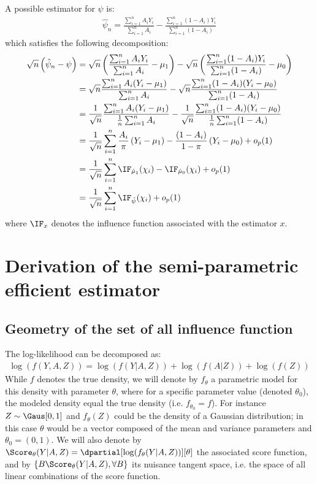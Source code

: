 \documentclass[12pt]{article}
\newcommand\sample{\chi}
\begin{document}
A possible estimator for \(\psi\) is:
\begin{align*}
\hat{\psi}_n = \frac{\sum_{i=1}^n A_i Y_i}{\sum_{i=1}^n A_i} - \frac{\sum_{i=1}^n (1-A_i) Y_i}{\sum_{i=1}^n (1-A_i)}
\end{align*}
which satisfies the following decomposition:
\begin{align*}
\sqrt{n}\left(\hat{\psi}_n - \psi\right) 
&= \sqrt{n} \left(\frac{\sum_{i=1}^n A_i Y_i}{\sum_{i=1}^n A_i} - \mu_1\right) - \sqrt{n} \left(\frac{\sum_{i=1}^n (1-A_i) Y_i}{\sum_{i=1}^n (1-A_i)} - \mu_0\right) \\
&= \sqrt{n} \frac{\sum_{i=1}^n A_i (Y_i-\mu_1)}{\sum_{i=1}^n A_i}  - \sqrt{n} \frac{\sum_{i=1}^n (1-A_i) (Y_i-\mu_0)}{\sum_{i=1}^n (1-A_i)} \\
&= \frac{1}{\sqrt{n}} \frac{\sum_{i=1}^n A_i (Y_i-\mu_1)}{\frac{1}{n}\sum_{i=1}^n A_i}  - \frac{1}{\sqrt{n}} \frac{\sum_{i=1}^n (1-A_i) (Y_i-\mu_0)}{\frac{1}{n}\sum_{i=1}^n (1-A_i)} \\
&= \frac{1}{\sqrt{n}} \sum_{i=1}^n \frac{A_i}{\pi} \left(Y_i - \mu_1\right) - \frac{(1-A_i)}{1-\pi}\left(Y_i - \mu_0\right) + o_p(1) \\
&= \frac{1}{\sqrt{n}} \sum_{i=1}^n \IF_{\hat{\mu}_1}(\sample_i) - \IF_{\hat{\mu}_0}(\sample_i)+ o_p(1) \\
&= \frac{1}{\sqrt{n}} \sum_{i=1}^n \IF_{\hat{\psi}}(\sample_i) + o_p(1)
\end{align*}
where \(\IF_x\) denotes the influence function associated with the
estimator \(x\).

\section{Derivation of the semi-parametric efficient estimator}
\label{sec:orgcb80b82}

\subsection{Geometry of the set of all influence function}
\label{sec:orgbada587}
The log-likelihood can be decomposed as:
\begin{align*}
\log(f(Y,A,Z)) = \log(f(Y|A,Z)) + \log(f(A|Z)) + \log(f(Z))
\end{align*}
While \(f\) denotes the true density, we will denote by \(f_{\theta}\)
a parametric model for this density with parameter \(\theta\), where
for a specific parameter value (denoted \(\theta_0\)), the modeled
density equal the true density (i.e. \(f_{\theta_0}=f\)). For instance
\(Z\sim\Gaus[0,1]\) and \(f_{\theta}(Z)\) could be the density of a
Gaussian distribution; in this case \(\theta\) would be a vector
composed of the mean and variance parameters and
\(\theta_0=(0,1)\). We will also denote by
\(\Score_{\theta}(Y|A,Z)=\dpartial[\log(f_{\theta}(Y|A,Z))][\theta]\)
the associated score function, and by \(\left\{B
\Score_{\theta}(Y|A,Z), \forall B \right\}\) its nuisance tangent
space, i.e. the space of all linear combinations of the score
function.
\end{document}
